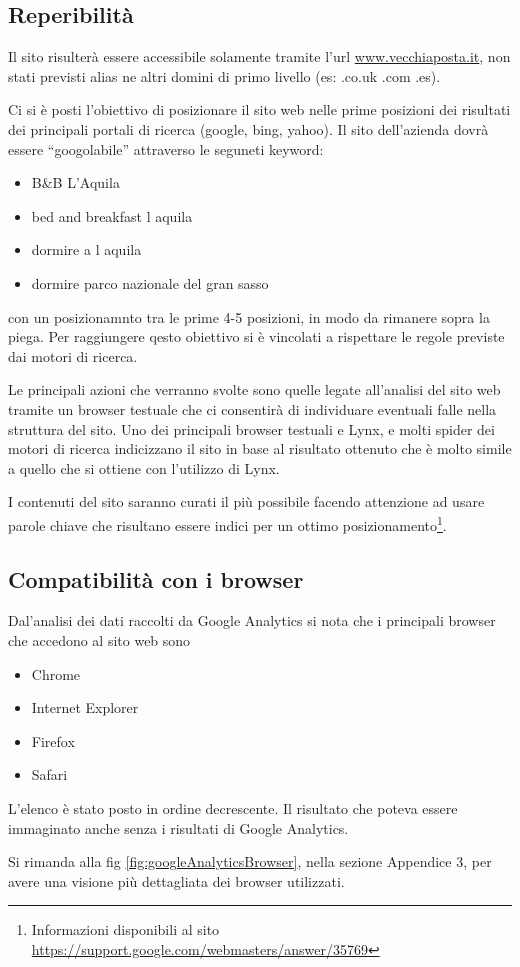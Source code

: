 \documentclass[a4paper,12pt,hidelinks]{report}
\begin{document}
  \subsection{Reperibilità}
    Il sito risulterà essere accessibile solamente tramite l'url \url{www.vecchiaposta.it}, non stati previsti alias ne altri domini di primo livello (es: .co.uk .com .es).
    \par Ci si è posti l'obiettivo di posizionare il sito web nelle prime posizioni dei risultati dei principali portali di ricerca (google, bing, yahoo).
    Il sito dell'azienda dovrà essere ``googolabile'' attraverso le seguneti keyword:
    \begin{itemize}
     \item B\&B L'Aquila
     \item bed and breakfast l aquila
     \item dormire a l aquila
     \item dormire parco nazionale del gran sasso
    \end{itemize}
    con un posizionamnto tra le prime 4-5 posizioni, in modo da rimanere sopra la piega.
    Per raggiungere qesto obiettivo si è vincolati a rispettare le regole previste dai motori di ricerca.
    \par Le principali azioni che verranno svolte sono quelle legate all'analisi del sito web tramite un browser testuale che ci consentirà di individuare eventuali
    falle nella struttura del sito. Uno dei principali browser testuali e Lynx, e molti spider dei motori di ricerca indicizzano il sito
    in base al risultato ottenuto che è molto simile a quello che si ottiene con l'utilizzo di Lynx. 
    \par I contenuti del sito saranno curati il più possibile facendo attenzione ad usare parole chiave che risultano essere indici per 
    un ottimo posizionamento\footnote{Informazioni disponibili al sito \url{https://support.google.com/webmasters/answer/35769}}.
        
  \subsection{Compatibilità con i browser}
    Dal'analisi dei dati raccolti da Google Analytics si nota che i principali browser che accedono al sito web sono
    \begin{itemize}
    \item Chrome
    \item Internet Explorer
    \item Firefox
    \item Safari
    \end{itemize}
    L'elenco è stato posto in ordine decrescente. Il risultato che poteva essere immaginato anche senza i risultati di Google Analytics.
    \par Si rimanda alla fig \ref{fig:googleAnalyticsBrowser}, nella sezione Appendice 3, per avere una visione più dettagliata dei browser utilizzati.
  
\end{document}
